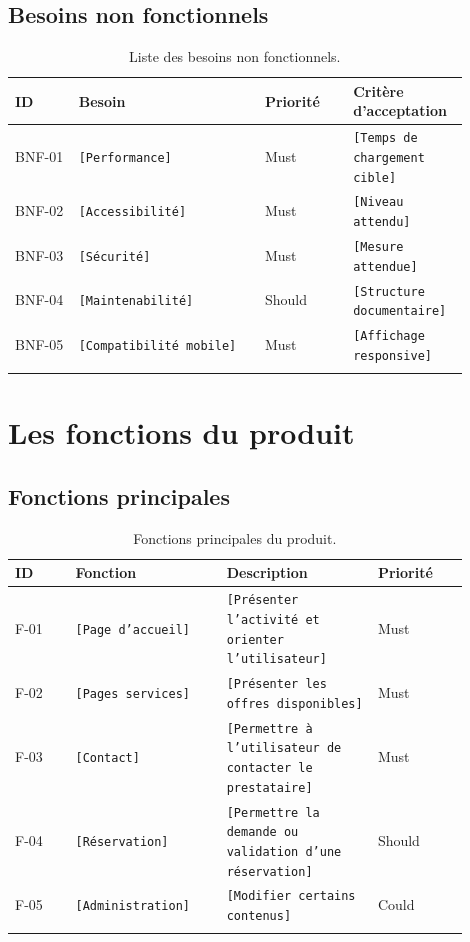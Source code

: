 \documentclass[11pt,a4paper]{report}
\newcommand{\placeholder}[1]{\textcolor{placeholderColor}{\texttt{[#1]}}}
\begin{document}
\section{Besoins non fonctionnels}
\begin{longtable}{p{0.13\linewidth}p{0.38\linewidth}p{0.18\linewidth}p{0.21\linewidth}}
\toprule
\textbf{ID} & \textbf{Besoin} & \textbf{Priorité} & \textbf{Critère d'acceptation} \\
\midrule
\endhead
BNF-01 & \placeholder{Performance} & Must & \placeholder{Temps de chargement cible} \\
BNF-02 & \placeholder{Accessibilité} & Must & \placeholder{Niveau attendu} \\
BNF-03 & \placeholder{Sécurité} & Must & \placeholder{Mesure attendue} \\
BNF-04 & \placeholder{Maintenabilité} & Should & \placeholder{Structure documentaire} \\
BNF-05 & \placeholder{Compatibilité mobile} & Must & \placeholder{Affichage responsive} \\
\bottomrule
\caption{Liste des besoins non fonctionnels.}
\label{tab:besoins-non-fonctionnels}
\end{longtable}

\chapter{Les fonctions du produit}

\section{Fonctions principales}
\begin{longtable}{p{0.12\linewidth}p{0.30\linewidth}p{0.30\linewidth}p{0.18\linewidth}}
\toprule
\textbf{ID} & \textbf{Fonction} & \textbf{Description} & \textbf{Priorité} \\
\midrule
\endhead
F-01 & \placeholder{Page d'accueil} & \placeholder{Présenter l'activité et orienter l'utilisateur} & Must \\
F-02 & \placeholder{Pages services} & \placeholder{Présenter les offres disponibles} & Must \\
F-03 & \placeholder{Contact} & \placeholder{Permettre à l'utilisateur de contacter le prestataire} & Must \\
F-04 & \placeholder{Réservation} & \placeholder{Permettre la demande ou validation d'une réservation} & Should \\
F-05 & \placeholder{Administration} & \placeholder{Modifier certains contenus} & Could \\
\bottomrule
\caption{Fonctions principales du produit.}
\label{tab:fonctions-principales}
\end{longtable}
\end{document}
